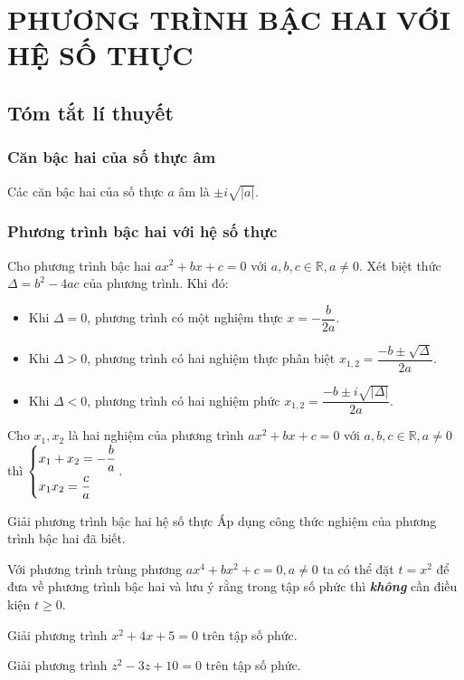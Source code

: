 \section{PHƯƠNG TRÌNH BẬC HAI VỚI HỆ SỐ THỰC}
\subsection{Tóm tắt lí thuyết}
\subsubsection{Căn bậc hai của số thực âm}
Các căn bậc hai của số thực $a$ âm là $\pm i\sqrt{|a|}$.
\subsubsection{Phương trình bậc hai với hệ số thực}
Cho phương trình bậc hai $ax^2+bx+c=0$ với $a, b, c\in\mathbb{R}, a\neq 0$. Xét biệt thức $\Delta=b^2-4ac$ của phương trình. Khi đó:
\begin{itemize}
\item Khi $\Delta=0$, phương trình có một nghiệm thực $x=-\dfrac{b}{2a}$.
\item Khi $\Delta>0$, phương trình có hai nghiệm thực phân biệt $x_{1,2}=\dfrac{-b\pm\sqrt{\Delta}}{2a}$.
\item Khi $\Delta<0$, phương trình có hai nghiệm phức $x_{1,2}=\dfrac{-b\pm i\sqrt{\left|\Delta\right|}}{2a}$.
\end{itemize}
\begin{dl}[Định lý Vi-et]
Cho $x_1, x_2$ là hai nghiệm của phương trình $ax^2+bx+c=0$ với $a, b, c\in\mathbb{R}, a\neq 0$ thì $\left\{\begin{aligned}&x_1+x_2=-\dfrac{b}{a}\\&x_1x_2=\dfrac{c}{a}\end{aligned}\right.$. 
\end{dl}
\begin{dang}{Giải phương trình bậc hai hệ số thực}
Áp dụng công thức nghiệm của phương trình bậc hai đã biết.
\begin{note}
Với phương trình trùng phương $ax^4+bx^2+c=0, a\neq 0$ ta có thể đặt $t=x^2$ để đưa về phương trình bậc hai và lưu ý rằng trong tập số phức thì \textbf{\textit{không}} cần điều kiện $t\geq 0$.
\end{note}
\end{dang}
\begin{vd}%
Giải phương trình $x^2+4x+5=0 $ trên tập số phức.
\end{vd}
\begin{vd}%
Giải phương trình $z^2-3z+10=0$ trên tập số phức.
\end{vd}


